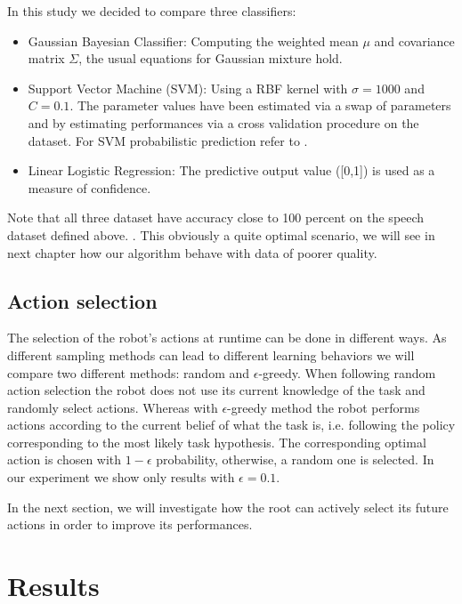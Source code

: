 In this study we decided to compare three classifiers:
\begin{itemize}
\item Gaussian Bayesian Classifier: Computing the weighted mean $\mu$ and covariance matrix $\Sigma$, the usual equations for Gaussian mixture hold.
\item Support Vector Machine (SVM): Using a RBF kernel with $\sigma = 1000$ and $C = 0.1$. The parameter values have been estimated via a swap of parameters and by estimating performances via a cross validation procedure on the dataset. For SVM probabilistic prediction refer to \cite{platt1999probabilistic}.
\item Linear Logistic Regression: The predictive output value ([0,1]) is used as a measure of confidence.
\end{itemize}

Note that all three dataset have accuracy close to 100 percent on the speech dataset defined above. . This obviously a quite optimal scenario, we will see in next chapter  how our algorithm behave with data of poorer quality.

\subsection{Action selection}

The selection of the robot's actions at runtime can be done in different ways. As different sampling methods can lead to different learning behaviors we will compare two different methods: random and  $\epsilon$-greedy. When following random action selection the robot does not use its current knowledge of the task and randomly select actions. Whereas with $\epsilon$-greedy method the robot performs actions according to the current belief of what the task is, i.e. following the policy corresponding to the most likely task hypothesis. The corresponding optimal action is chosen with $1-\epsilon$ probability, otherwise, a random one is selected. In our experiment we show only results with $\epsilon =  0.1$.

In the next section, we will investigate how the root can actively select its future actions in order to improve its performances.

\section{Results}

